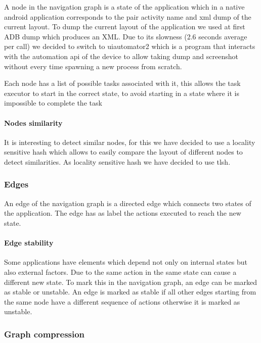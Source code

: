 A node in the navigation graph is a state of the application which in a
native android application corresponds to the pair activity name and xml
dump of the current layout. To dump the current layout of the
application we used at first ADB dump which produces an XML. Due to its
slowness (2.6 seconds average per call) we decided to switch to
uiautomator2 which is a program that interacts with the automation api
of the device to allow taking dump and screenshot without every time
spawning a new process from scratch.

Each node has a list of possible tasks associated with it, this allows
the task executor to start in the correct state, to avoid starting in a
state where it is impossible to complete the task

\paragraph{Nodes similarity}\label{nodes-similarity}

It is interesting to detect similar nodes, for this we have decided to
use a locality sensitive hash which allows to easily compare the layout
of different nodes to detect similarities. As locality sensitive hash we
have decided to use tlsh.

\subsubsection{Edges}\label{edges}

An edge of the navigation graph is a directed edge which connects two
states of the application. The edge has as label the actions executed to
reach the new state.

\paragraph{Edge stability}\label{edge-stability}

Some applications have elements which depend not only on internal states
but also external factors. Due to the same action in the same state can
cause a different new state. To mark this in the navigation graph, an
edge can be marked as stable or unstable. An edge is marked as stable if
all other edges starting from the same node have a different sequence of
actions otherwise it is marked as unstable.

\subsubsection{Graph compression}\label{graph-compression}

